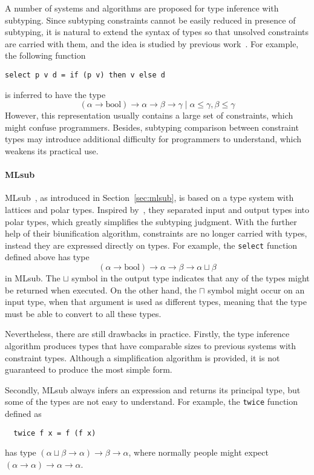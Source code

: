 A number of systems and algorithms are proposed for type inference with subtyping.
Since subtyping constraints cannot be easily reduced in presence of subtyping,
it is natural to extend the syntax of types so that unsolved constraints are carried with them,
and the idea is studied by previous work~\citep{RecConstraint1995, subcon1996}.
For example, the following function
\begin{verbatim}
select p v d = if (p v) then v else d
\end{verbatim}
is inferred to have the type
$$(\alpha \to \text{bool}) \to \alpha \to \beta \to \gamma \mid \alpha \le \gamma, \beta \le \gamma$$
However, this representation usually contains a large set of constraints,
which might confuse programmers.
Besides, subtyping comparison between constraint types may introduce additional
difficulty for programmers to understand, which weakens its practical use.

\paragraph{MLsub}
MLsub~\citep{mlsub}, as introduced in Section~\ref{sec:mlsub},
is based on a type system with lattices and polar types.
Inspired by~\citep{pottier1998phd}, they separated input and output types into polar types,
which greatly simplifies the subtyping judgment.
With the further help of their biunification algorithm,
constraints are no longer carried with types,
instead they are expressed directly on types.
For example, the \verb|select| function defined above has type
$$(\alpha \to \text{bool}) \to \alpha \to \beta \to \alpha \sqcup \beta$$
in MLsub.
The $\sqcup$ symbol in the output type indicates that
any of the types might be returned when executed.
On the other hand, the $\sqcap$ symbol might occur on an input type,
when that argument is used as different types,
meaning that the type must be able to convert to all these types.

Nevertheless, there are still drawbacks in practice.
Firstly, the type inference algorithm produces types that
have comparable sizes to previous systems with constraint types.
Although a simplification algorithm is provided,
it is not guaranteed to produce the most simple form.

Secondly, MLsub always infers an expression and returns its principal type,
but some of the types are not easy to understand.
For example, the \verb|twice| function defined as
\begin{verbatim}
  twice f x = f (f x)
\end{verbatim}
has type $(\alpha \sqcup \beta \to \alpha) \to \beta \to \alpha$,
where normally people might expect $(\alpha \to \alpha) \to \alpha \to \alpha$.

